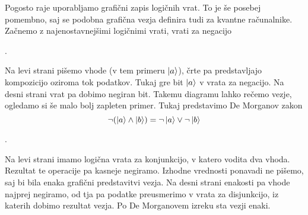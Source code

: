 \documentclass[mat1]{fmfdelo}
\begin{document}
Pogosto raje uporabljamo grafični zapis logičnih vrat. To je še posebej pomembno, saj se podobna grafična vezja definira tudi za kvantne računalnike. Začnemo z najenostavnejšimi logičnimi vrati, vrati za negacijo
\begin{center}
    .
\end{center}
Na levi strani pišemo vhode (v tem primeru \(\ket{a}\)), črte pa predstavljajo kompozicijo oziroma tok podatkov. Tukaj gre bit \(\ket{a}\) v vrata za negacijo. Na desni strani vrat pa dobimo negiran bit. Takemu diagramu lahko rečemo vezje, ogledamo si še malo bolj zapleten primer. Tukaj predstavimo De Morganov zakon
\[
    \lnot(\ket{a}\land \ket{b}) = \lnot\ket{a} \lor \lnot \ket{b}
\]
\begin{center}
    .
\end{center}
Na levi strani imamo logična vrata za konjunkcijo, v katero vodita dva vhoda. Rezultat te operacije pa kasneje negiramo. Izhodne vrednosti ponavadi ne pišemo, saj bi bila enaka grafični predstavitvi vezja. Na desni strani enakosti pa vhode najprej negiramo, od tja pa podatke preusmerimo v vrata za disjunkcijo, iz katerih dobimo rezultat vezja. Po De Morganovem izreku sta vezji enaki.
\end{document}
